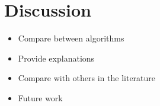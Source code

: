 \section{Discussion}
\label{disc}

\begin{itemize}
	\item Compare between algorithms
	\item Provide explanations
	\item Compare with others in the literature
	\item Future work
\end{itemize}


